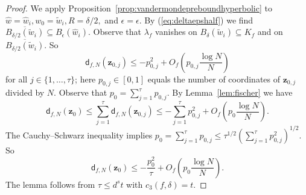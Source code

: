 \documentclass[12pt,oneside,a4]{amsart}
\numberwithin{maincounter}{section}
\numberwithin{equation}{section}
\renewcommand{\subset}{\subseteq}
\newcommand{\bfz}{\boldsymbol{z}}
\begin{document}
\begin{proof}
  We apply Proposition~\ref{prop:vandermondepreboundhyperbolic} to
  $\widehat w = \widehat w_i, w_0 = \widetilde w_i, R=\delta/2,$ and
  $\epsilon= \epsilon$.
  By (\ref{eq:deltaepshalf}) we find
  $\overline{B_{\delta/2}(\widetilde w_i)} \subset
  B_{\epsilon}(\widehat w_i)$.  
  Observe that  $\lambda_f$ vanishes
  on ${B_{\delta}(\widetilde w_i)}\subset K_f$ and on
  $\overline{B_{\delta/2}(\widetilde w_i)}$.
  So
  \begin{equation*}
    \mathsf{d}_{f,N}(\bfz_{0,j}) \le -p_{0,j}^2 + O_f\left(p_{0,j}\frac{\log N}{N}\right)
  \end{equation*}
  for all $j\in \{1,\ldots ,\tau\}$; here $p_{0,j}\in [0,1]$ equals the number
  of coordinates of $\bfz_{0,j}$ divided by $N$.  
  Observe that $p_0 = \sum_{j=1}^\tau p_{0,j}$. By Lemma~\ref{lem:fischer} we have
  \begin{equation*}
    \mathsf{d}_{f,N}(\bfz_0) \le\sum_{j=1}^\tau \mathsf{d}_{f,N}(\bfz_{0,j})
    \le -\sum_{j=1}^\tau p_{0,j}^2 + O_f\left(p_0\frac{\log N}{N}\right).
  \end{equation*}
  The Cauchy--Schwarz inequality implies
  $p_0 = \sum_{j=1}^\tau p_{0,j}\le \tau^{1/2}\left(\sum_{j=1}^\tau
    p_{0,j}^2\right)^{1/2}$. So
  \begin{equation*}
    \mathsf{d}_{f,N}(\bfz_0) \le -\frac{p_0^2}{\tau} + O_f\left(p_0\frac{\log N}{N}\right).
  \end{equation*}
  The lemma follows from $\tau \le d^s t$ with $c_3(f,\delta)=t$. 
\end{proof}
\end{document}

